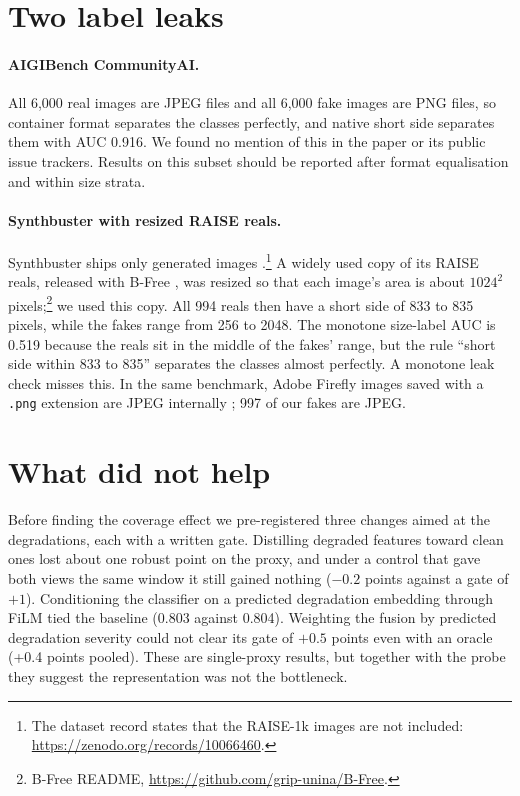 \documentclass[letterpaper]{article} %
\begin{document}
\section{Two label leaks}
\label{sec:leaks}

\paragraph{AIGIBench CommunityAI.} All 6,000 real images are JPEG files and all
6,000 fake images are PNG files, so container format separates the classes
perfectly, and native short side separates them with AUC 0.916. We found no
mention of this in the paper or its public issue trackers. Results on this
subset should be reported after format equalisation and within size strata.

\paragraph{Synthbuster with resized RAISE reals.} Synthbuster ships only
generated images \cite{bammey2024synthbuster}.\footnote{The dataset record
states that the RAISE-1k images are not included:
\url{https://zenodo.org/records/10066460}.} A widely used copy of its RAISE
reals, released with B-Free \cite{guillaro2025bfree}, was resized so that
each image's area is about $1024^2$ pixels;\footnote{B-Free README,
\url{https://github.com/grip-unina/B-Free}.} we used this copy. All 994 reals then have a
short side of 833 to 835 pixels, while the fakes range from 256 to 2048. The
monotone size-label AUC is 0.519 because the reals sit in the middle of the
fakes' range, but the rule ``short side within 833 to 835'' separates the
classes almost perfectly. A monotone leak check misses this. In the same
benchmark, Adobe Firefly images saved with a \texttt{.png} extension are JPEG
internally \cite{ricker2026biasid}; 997 of our fakes are JPEG.

\section{What did not help}

Before finding the coverage effect we pre-registered three changes aimed
at the degradations, each with a written gate. Distilling degraded features
toward clean ones lost about one robust point on the proxy, and under a
control that gave both views the same window it still gained nothing
($-0.2$ points against a gate of $+1$).
Conditioning the classifier on a predicted degradation embedding through FiLM
tied the baseline (0.803 against 0.804). Weighting the fusion by predicted
degradation severity could not clear its gate of $+0.5$ points even with an
oracle (+0.4 points pooled). These are single-proxy results, but together with the probe they
suggest the representation was not the bottleneck.
\end{document}
